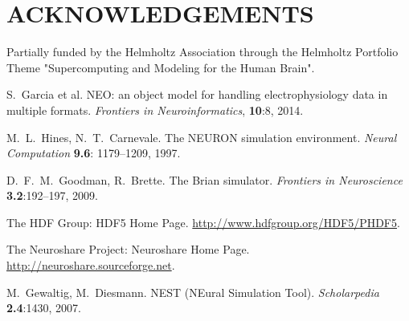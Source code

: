 \documentclass[]{YIC2015}
\begin{document}
\section*{ACKNOWLEDGEMENTS}

Partially funded by the Helmholtz Association through the Helmholtz
Portfolio Theme "Supercomputing and Modeling for the Human Brain".


\begin{thebibliography}{99}




S.~Garcia et al.
NEO: an object model for handling electrophysiology data in multiple formats.
\textit{Frontiers in Neuroinformatics}, \textbf{10}:8, 2014.

M.~L.~Hines, N.~T.~Carnevale. The NEURON simulation environment. \textit{Neural Computation} \textbf{9.6}: 1179--1209, 1997.

D.~F.~M.~Goodman, R.~Brette. The Brian simulator. \textit{Frontiers in Neuroscience} \textbf{3.2}:192--197, 2009.


The HDF Group: HDF5 Home Page. \url{http://www.hdfgroup.org/HDF5/PHDF5}.

The Neuroshare Project: Neuroshare Home Page. \url{http://neuroshare.sourceforge.net}.

M.~Gewaltig, M.~Diesmann. NEST (NEural Simulation Tool). \textit{Scholarpedia} %
\textbf{2.4}:1430, 2007.


\end{thebibliography}
\end{document}
